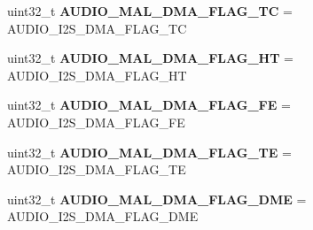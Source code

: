 \begin{DoxyCompactItemize}
\item 
\hypertarget{group___s_t_m32_f4___d_i_s_c_o_v_e_r_y___a_u_d_i_o___c_o_d_e_c___private___functions_gadc66502b8df5553a3d97df353f488f6b}{uint32\-\_\-t {\bfseries A\-U\-D\-I\-O\-\_\-\-M\-A\-L\-\_\-\-D\-M\-A\-\_\-\-F\-L\-A\-G\-\_\-\-T\-C} = A\-U\-D\-I\-O\-\_\-\-I2\-S\-\_\-\-D\-M\-A\-\_\-\-F\-L\-A\-G\-\_\-\-T\-C}\label{group___s_t_m32_f4___d_i_s_c_o_v_e_r_y___a_u_d_i_o___c_o_d_e_c___private___functions_gadc66502b8df5553a3d97df353f488f6b}

\item 
\hypertarget{group___s_t_m32_f4___d_i_s_c_o_v_e_r_y___a_u_d_i_o___c_o_d_e_c___private___functions_ga7e0ebf204766ba811943921d90bb64a2}{uint32\-\_\-t {\bfseries A\-U\-D\-I\-O\-\_\-\-M\-A\-L\-\_\-\-D\-M\-A\-\_\-\-F\-L\-A\-G\-\_\-\-H\-T} = A\-U\-D\-I\-O\-\_\-\-I2\-S\-\_\-\-D\-M\-A\-\_\-\-F\-L\-A\-G\-\_\-\-H\-T}\label{group___s_t_m32_f4___d_i_s_c_o_v_e_r_y___a_u_d_i_o___c_o_d_e_c___private___functions_ga7e0ebf204766ba811943921d90bb64a2}

\item 
\hypertarget{group___s_t_m32_f4___d_i_s_c_o_v_e_r_y___a_u_d_i_o___c_o_d_e_c___private___functions_ga11034ab21195b08a8a885f46733e843e}{uint32\-\_\-t {\bfseries A\-U\-D\-I\-O\-\_\-\-M\-A\-L\-\_\-\-D\-M\-A\-\_\-\-F\-L\-A\-G\-\_\-\-F\-E} = A\-U\-D\-I\-O\-\_\-\-I2\-S\-\_\-\-D\-M\-A\-\_\-\-F\-L\-A\-G\-\_\-\-F\-E}\label{group___s_t_m32_f4___d_i_s_c_o_v_e_r_y___a_u_d_i_o___c_o_d_e_c___private___functions_ga11034ab21195b08a8a885f46733e843e}

\item 
\hypertarget{group___s_t_m32_f4___d_i_s_c_o_v_e_r_y___a_u_d_i_o___c_o_d_e_c___private___functions_ga7c2679903a9ba0d5c050d3967edc55b7}{uint32\-\_\-t {\bfseries A\-U\-D\-I\-O\-\_\-\-M\-A\-L\-\_\-\-D\-M\-A\-\_\-\-F\-L\-A\-G\-\_\-\-T\-E} = A\-U\-D\-I\-O\-\_\-\-I2\-S\-\_\-\-D\-M\-A\-\_\-\-F\-L\-A\-G\-\_\-\-T\-E}\label{group___s_t_m32_f4___d_i_s_c_o_v_e_r_y___a_u_d_i_o___c_o_d_e_c___private___functions_ga7c2679903a9ba0d5c050d3967edc55b7}

\item 
\hypertarget{group___s_t_m32_f4___d_i_s_c_o_v_e_r_y___a_u_d_i_o___c_o_d_e_c___private___functions_ga3d81d3dc07c210eb577b3520ae206abb}{uint32\-\_\-t {\bfseries A\-U\-D\-I\-O\-\_\-\-M\-A\-L\-\_\-\-D\-M\-A\-\_\-\-F\-L\-A\-G\-\_\-\-D\-M\-E} = A\-U\-D\-I\-O\-\_\-\-I2\-S\-\_\-\-D\-M\-A\-\_\-\-F\-L\-A\-G\-\_\-\-D\-M\-E}\label{group___s_t_m32_f4___d_i_s_c_o_v_e_r_y___a_u_d_i_o___c_o_d_e_c___private___functions_ga3d81d3dc07c210eb577b3520ae206abb}

\end{DoxyCompactItemize}



